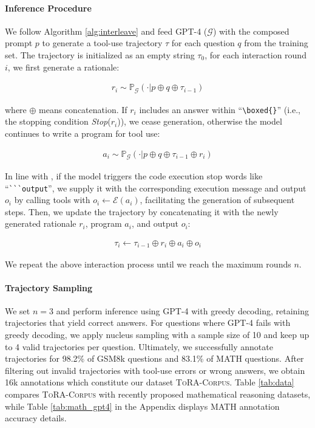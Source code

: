 \paragraph{Inference Procedure} We follow Algorithm \ref{alg:interleave} and feed GPT-4 ($\mathcal{G}$) with the composed prompt $p$ to generate a tool-use trajectory $\tau$ for each question $q$ from the training set. The trajectory is initialized as an empty string $\tau_0$, for each interaction round $i$, we first generate a rationale:

\begin{align}
r_{i}\sim \mathbb{P}_{\mathcal{G}}(\cdot|p\oplus q\oplus \tau_{i-1})
\label{eq:rationale}
\end{align}

where $\oplus$ means concatenation. If $r_i$ includes an answer within ``\lstinline|\boxed{}|'' (i.e., the stopping condition \textit{Stop}($r_i$)), we cease generation, otherwise the model continues to write a program for tool use:

\begin{align}
a_i \sim \mathbb{P}_{\mathcal{G}}(\cdot|p\oplus q\oplus \tau_{i-1}\oplus r_i)
\label{eq:program}
\end{align}

In line with \citet{gou2023critic}, if the model triggers the code execution stop words like ``\lstinline|```output|'', we supply it with the corresponding execution message and output $o_i$ by calling tools with $o_{i} \leftarrow \mathcal{E}(a_i)$, facilitating the generation of subsequent steps. Then, we update the trajectory by concatenating it with the newly generated rationale $r_{i}$, program $a_i$, and output $o_i$:

\begin{align}
\tau_{i} \leftarrow \tau_{i-1}\oplus r_{i}\oplus a_i\oplus o_{i}
\label{eq:update}
\end{align}

We repeat the above interaction process until we reach the maximum rounds $n$.

\paragraph{Trajectory Sampling} We set $n=3$ and perform inference using GPT-4 with greedy decoding, retaining trajectories that yield correct answers. For questions where GPT-4 fails with greedy decoding, we apply nucleus sampling with a sample size of 10 and keep up to 4 valid trajectories per question. Ultimately, we successfully annotate trajectories for 98.2\% of GSM8k questions and 83.1\% of MATH questions. After filtering out invalid trajectories with tool-use errors or wrong answers, we obtain 16k annotations which constitute our dataset \textsc{ToRA-Corpus}.
Table \ref{tab:data} compares \textsc{ToRA-Corpus} with recently proposed mathematical reasoning datasets, while Table \ref{tab:math_gpt4} in the Appendix displays MATH annotation accuracy details.

